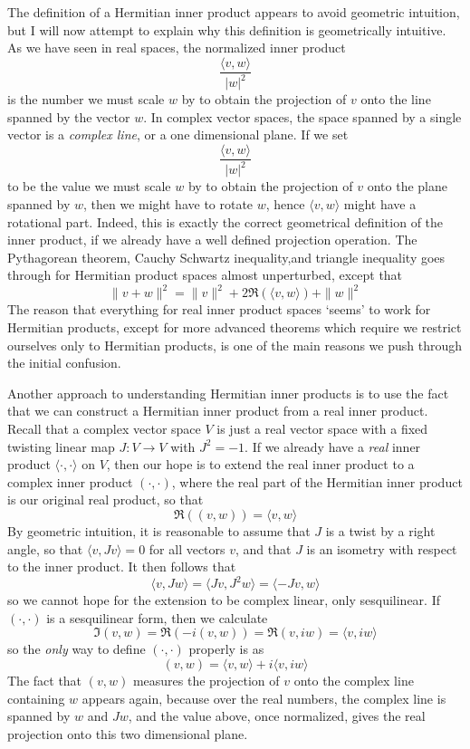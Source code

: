 The definition of a Hermitian inner product appears to avoid geometric intuition, but I will now attempt to explain why this definition is geometrically intuitive. As we have seen in real spaces, the normalized inner product
%
\[ \frac{\langle v, w \rangle}{|w|^2} \]
%
is the number we must scale $w$ by to obtain the projection of $v$ onto the line spanned by the vector $w$. In complex vector spaces, the space spanned by a single vector is a {\it complex line}, or a one dimensional plane. If we set
%
\[ \frac{\langle v, w \rangle}{|w|^2} \]
%
to be the value we must scale $w$ by to obtain the projection of $v$ onto the plane spanned by $w$, then we might have to rotate $w$, hence $\langle v, w \rangle$ might have a rotational part. Indeed, this is exactly the correct geometrical definition of the inner product, if we already have a well defined projection operation. The Pythagorean theorem, Cauchy Schwartz inequality,and triangle inequality goes through for Hermitian product spaces almost unperturbed, except that
%
\[ \| v + w \|^2 = \| v \|^2 + 2 \Re(\langle v, w \rangle) + \| w \|^2 \]
%
The reason that everything for real inner product spaces `seems' to work for Hermitian products, except for more advanced theorems which require we restrict ourselves only to Hermitian products, is one of the main reasons we push through the initial confusion.

Another approach to understanding Hermitian inner products is to use the fact that we can construct a Hermitian inner product from a real inner product. Recall that a complex vector space $V$ is just a real vector space with a fixed twisting linear map $J: V \to V$ with $J^2 = -1$. If we already have a {\it real} inner product $\langle \cdot, \cdot \rangle$ on $V$, then our hope is to extend the real inner product to a complex inner product $(\cdot,\cdot)$, where the real part of the Hermitian inner product is our original real product, so that
%
\[ \Re((v,w)) = \langle v, w \rangle \]
%
By geometric intuition, it is reasonable to assume that $J$ is a twist by a right angle, so that $\langle v, Jv \rangle = 0$ for all vectors $v$, and that $J$ is an isometry with respect to the inner product. It then follows that
%
\[ \langle v, Jw \rangle = \langle Jv, J^2w \rangle = \langle -Jv, w \rangle \]
%
so we cannot hope for the extension to be complex linear, only sesquilinear. If $(\cdot, \cdot)$ is a sesquilinear form, then we calculate
%
\[ \Im (v,w) = \Re(-i (v,w)) = \Re (v,iw) = \langle v, iw \rangle \]
%
so the {\it only} way to define $(\cdot, \cdot)$ properly is as
%
\[ (v,w) = \langle v, w \rangle + i \langle v, iw \rangle \]
%
The fact that $(v,w)$ measures the projection of $v$ onto the complex line containing $w$ appears again, because over the real numbers, the complex line is spanned by $w$ and $Jw$, and the value above, once normalized, gives the real projection onto this two dimensional plane.

